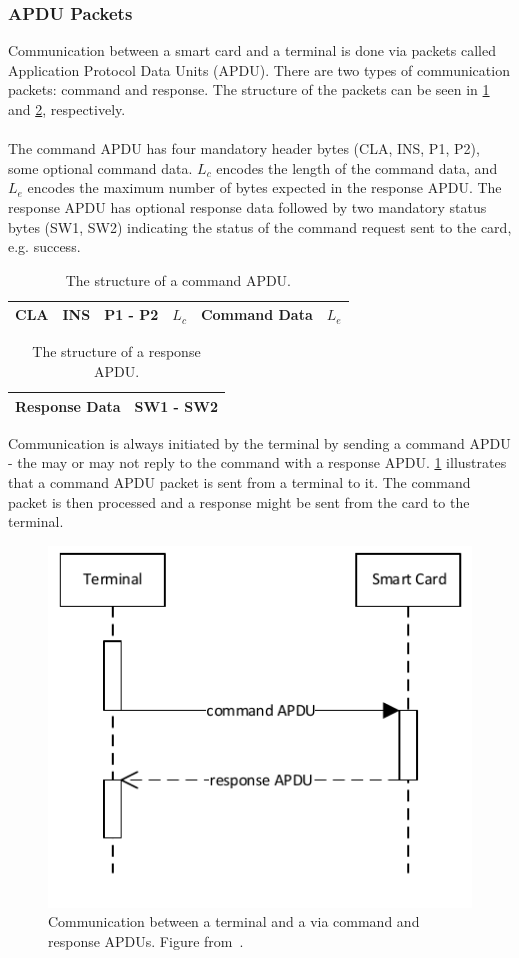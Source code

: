 \subsubsection{APDU Packets}\label{subsec:apdu}
Communication between a smart card and a terminal is done via packets called Application Protocol Data Units (APDU). There are two types of communication packets: command and response. The structure of the packets can be seen in \cref{tab:apduCommand} and \cref{tab:apduResponse}, respectively.\\\\
The command APDU has four mandatory header bytes (CLA, INS, P1, P2), some optional command data. $L_{c}$ encodes the length of the command data, and $L_{e}$ encodes the maximum number of bytes expected in the response APDU.
The response APDU has optional response data followed by two mandatory status bytes (SW1, SW2) indicating the status of the command request sent to the card, e.g. success.

\begin{table}[H]
	\centering
    \begin{tabular}{|l|l|l|l|l|l|}
    \hline
    CLA & INS & P1 - P2 & $L_{c}$ & Command Data & $L_{e}$ \\ \hline
    \end{tabular}
    \caption{The structure of a command APDU.}
    \label{tab:apduCommand}
\end{table}

\begin{table}[H]
	\centering
    \begin{tabular}{|l|l|}
    \hline
    Response Data & SW1 - SW2 \\ \hline
    \end{tabular}
    \caption{The structure of a response APDU.}
    \label{tab:apduResponse}
\end{table}

\noindent Communication is always initiated by the terminal by sending a command APDU - the \jc may or may not reply to the command with a response APDU. \cref{fig:apdu} illustrates that a command APDU packet is sent from a terminal to it. The command packet is then processed and a response might be sent from the card to the terminal.
 
\begin{figure}[H]
  \centering
  \includegraphics[scale=1, trim=0cm 0cm 0cm 0cm]{figures/apdu}
  \caption{Communication between a terminal and a \jc via command and response APDUs. Figure from~\cite[p. 4]{javasec}.}
  \label{fig:apdu}
\end{figure}